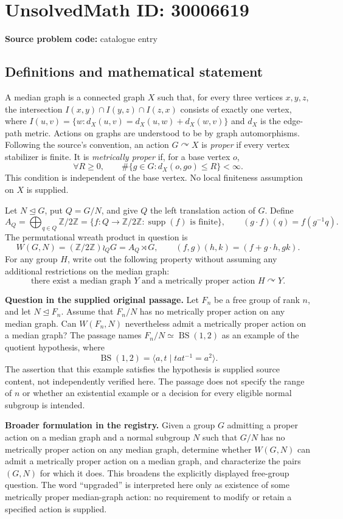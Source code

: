 \documentclass[11pt]{article}
\begin{document}
\section*{UnsolvedMath ID: 30006619}
\textbf{Source problem code:} catalogue entry
\subsection{Definitions and mathematical statement}
A median graph is a connected graph \(X\) such that, for every three vertices \(x,y,z\), the intersection \(I(x,y)\cap I(y,z)\cap I(z,x)\) consists of exactly one vertex, where \(I(u,v)=\{w:d_X(u,v)=d_X(u,w)+d_X(w,v)\}\) and \(d_X\) is the edge-path metric. Actions on graphs are understood to be by graph automorphisms. Following the source's convention, an action \(G\curvearrowright X\) is \emph{proper} if every vertex stabilizer is finite. It is \emph{metrically proper} if, for a base vertex \(o\),
\[
\forall R\geq 0,\qquad \#\{g\in G:d_X(o,go)\leq R\}<\infty.
\]
This condition is independent of the base vertex. No local finiteness assumption on \(X\) is supplied.

Let \(N\trianglelefteq G\), put \(Q=G/N\), and give \(Q\) the left translation action of \(G\). Define
\[
A_Q=\bigoplus_{q\in Q}\mathbb Z/2\mathbb Z
=\{f:Q\to\mathbb Z/2\mathbb Z:\operatorname{supp}(f)\text{ is finite}\},
\qquad (g\cdot f)(q)=f(g^{-1}q).
\]
The permutational wreath product in question is
\[
W(G,N)=(\mathbb Z/2\mathbb Z)\wr_QG=A_Q\rtimes G,
\qquad (f,g)(h,k)=(f+g\cdot h,gk).
\]
For any group \(H\), write out the following property without assuming any additional restrictions on the median graph:
\[
\text{there exist a median graph }Y\text{ and a metrically proper action }H\curvearrowright Y.
\]

\textbf{Question in the supplied original passage.} Let \(F_n\) be a free group of rank \(n\), and let \(N\trianglelefteq F_n\). Assume that \(F_n/N\) has no metrically proper action on any median graph. Can \(W(F_n,N)\) nevertheless admit a metrically proper action on a median graph? The passage names \(F_n/N\simeq\operatorname{BS}(1,2)\) as an example of the quotient hypothesis, where
\[
\operatorname{BS}(1,2)=\langle a,t\mid tat^{-1}=a^2\rangle.
\]
The assertion that this example satisfies the hypothesis is supplied source content, not independently verified here. The passage does not specify the range of \(n\) or whether an existential example or a decision for every eligible normal subgroup is intended.

\textbf{Broader formulation in the registry.} Given a group \(G\) admitting a proper action on a median graph and a normal subgroup \(N\) such that \(G/N\) has no metrically proper action on any median graph, determine whether \(W(G,N)\) can admit a metrically proper action on a median graph, and characterize the pairs \((G,N)\) for which it does. This broadens the explicitly displayed free-group question. The word ``upgraded'' is interpreted here only as existence of some metrically proper median-graph action: no requirement to modify or retain a specified action is supplied.
\end{document}
